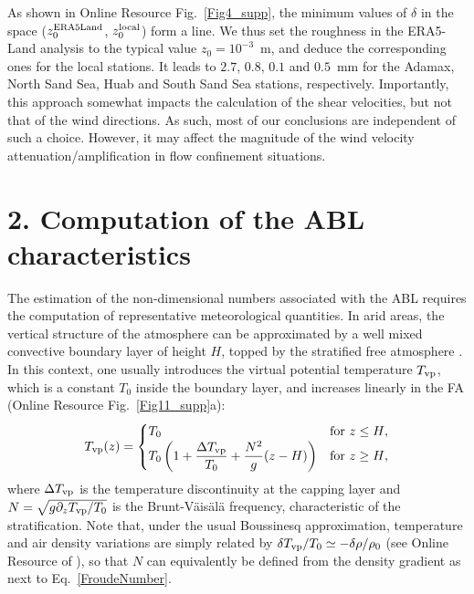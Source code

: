 As shown in Online Resource Fig.~\ref{Fig4_supp}, the minimum values of $\delta$ in the space ($z_{0}^{\textup{ERA5Land}}$, $z_{0}^{\textup{local}}$) form a line. We thus set the roughness in the ERA5-Land analysis to the typical value $z_0=10^{-3}$~m, and deduce the corresponding ones for the local stations. It leads to $2.7$, $0.8$, $0.1$ and $0.5$~mm for the Adamax, North Sand Sea, Huab and South Sand Sea stations, respectively. Importantly, this approach somewhat impacts the calculation of the shear velocities, but not that of the wind directions. As such, most of our conclusions are independent of such a choice. However, it may affect the magnitude of the wind velocity attenuation/amplification in flow confinement situations.


\section*{2. Computation of the ABL characteristics}

The estimation of the non-dimensional numbers associated with the ABL requires the computation of representative meteorological quantities. In arid areas, the vertical structure of the atmosphere can be approximated by a well mixed convective boundary layer of height $H$, topped by the stratified free atmosphere \citep{Stull1988, Shao2008}. In this context, one usually introduces the virtual potential temperature $T_{\textup{vp}}$, which is a constant $T_{0}$ inside the boundary layer, and increases linearly in the FA (Online Resource Fig.~\ref{Fig11_supp}a):
%
\begin{equation}
T_{\textup{vp}}(z) =
\begin{cases}
T_{0} &\text{for $z \leq H$},\\
T_{0}\left(1 + \displaystyle\frac{\Delta T_{\textup{vp}}}{T_{0}} + \frac{N^{2}}{g}(z - H)\right) &\text{for $ z \geq H$},
\end{cases}
\label{TvpVerticalProfile}
\end{equation}
%
where $\Delta T_{\textup{vp}}$ is the temperature discontinuity at the capping layer and $N = \sqrt{g \partial_z T_{\textup{vp}} / T_{0}}$ is the Brunt-V\"ais\"al\"a frequency, characteristic of the stratification. Note that, under the usual Boussinesq approximation, temperature and air density variations are simply related by $\delta T_{\textup{vp}}/T_{0} \simeq - \delta\rho/\rho_{0}$ (see Online Resource of \citet{Andreotti2009}), so that $N$ can equivalently be defined from the density gradient as next to Eq.~\ref{FroudeNumber}.

